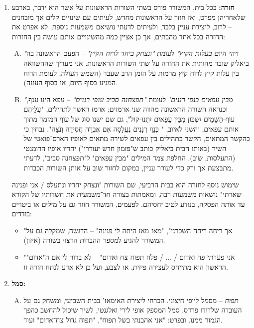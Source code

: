 \documentclass[]{article}
\begin{document}
\begin{enumerate}
		\item \textbf{חזרה: }בכל בית, המשורר פורס בשתי השורות הראשונות על אשר הוא ידבר, בארבע שלאחריהן מפרט, ואז חוזר על הראשונות מחדש, לעיתים עם שינויים קלים אך מובחנים – לרוב, ליצירת עניין בלבד, ולעיתים לדעתי נושיאם משמעות נוספת. לא אפרט את החזרה בכל אחד מהבתים, אך כן אציין כמה מהשינויים אותם עושה בין החזרות: 
		\begin{enumerate}[A. ]
			\item \textit{"ויהי היום בעלות הקיץ"} לעומת \textit{"ונצחק ביחד לרוח הקיץ"} – הפעם הראשונה בה ביאליק שובר מהותית את החזרה על שתי השורות הראשונות. אני מעריך שההשוואה בין עלות קיץ לרוח קיץ מרמזת על הזמן הרב שעבר (השמש העולה, לעומת הרוח המגיע בסוף היום, או בסוף העונה). 
			\item \textit{"מבין עפאים כנפי רננים"} לעומת \textit{"תפצחנה סביב ענפי רננים"} – עפא הינו ענף, וכנראה השורה הראשונה מהווה שני ארמזים; ארמז ראשון לתהילים, "עֲלֵיהֶם עוֹף-הַשָּׁמַיִם יִשְׁכּוֹן מִבֵּין עֳפָאיִם יִתְּנוּ-קוֹל", גם שם ישנו סוג של עוף המזמר מתוך אותם עפאים, והשני לאיוב, " כְּנַף רְנָנִים נֶעֱלָסָה אִם אֶבְרָה חֲסִידָה וְנֹצָה". נבחין כי בהקשר המתאים, הקשר בתהילים בין עפאים לשירה מתאים לאופיו הארס־פואטי של השיר (באותו הבית ביאליק כותב ש"פזמון חדש יעוררו") יחדיו אופיו הרומנטי (התעלסות, שוב). החלפת צמד המילים "מבין עפאים" ל"תפצחנה סביב", לדעתי מתבצעת אך ורק כדי לעורר עניין, במקום לחזור שוב על אותן השורות הכבדות. 
			
		\end{enumerate}
		
		שימוש נוסף לחזרה הוא בבית הרביעי, שם השורות "ונצחק יחדיו ונתעלס / אני ופנינה שארתי" נושאות משמעות רבה, ומאמתות בצורה חד־משמעית את חשדותיו של הקורא עד אותה הפסקה, בנודע לטיב יחסיהם. לפעמים, המשורר חוזר גם על מילים או ביטויים בודדים: 
		\begin{itemize}
			\item "אך ריחה ריחה השכרני", "מאז מאז היתה לי פנינה" – הדגשה, שמקלה גם על המשורר להגיע למספר ההברות הרצוי בשורה (איזון). 
			\item "אני פערתי פה ואדום / ... / פלח תפוח צח ואדום" – לא ברור לי אם ה"אדום" הראשון הוא מתייחס לעצירה פיזית, או לצבע, ועל כן לא אדע לנתח חזרה זו. 
		\end{itemize}
		\item \textbf{סמל: }
		\begin{enumerate}[A. ]
			\item \textit{תפוח} – מסמל ליופי חיצוני. הכרחי ליצירת האימאז' בבית השביעי, ומשחק גם על העובדה שלדודו פרדס. סמל המספק אופי לירי ואלגנטי, לשיר שיכול להחשב כהפך הגמור ממנו. ובפרט: "אני אהבנתי בשל תפוח", "תפוח גדול צח־אדום" ועוד. 
			

\end{enumerate}
\end{enumerate}
\end{document}
